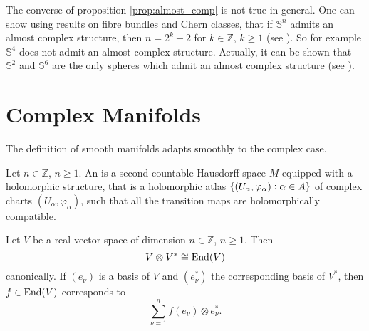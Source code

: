 \begin{remark}
The converse of proposition \ref{prop:almost_comp} is not true in general. One can show using results on fibre bundles and Chern classes, that if $\mathbb{S}^n$ admits an almost complex structure, then $n = 2^k - 2$ for $k \in \mathbb{Z}$, $k \geq 1$ (see \cite[219]{steenrod:topology_fibre:1951}). So for example $\mathbb{S}^4$ does not admit an almost complex structure. Actually, it can be shown that $\mathbb{S}^2$ and $\mathbb{S}^6$ are the only spheres which admit an almost complex structure (see \cite[434]{borel:steenrod:1953}).
\end{remark}

\section{Complex Manifolds}
The definition of smooth manifolds adapts smoothly to the complex case.

\begin{definition}
Let $n \in \mathbb{Z}$, $n \geq 1$. An  is a second countable Hausdorff space $M$ equipped with a holomorphic structure, that is a holomorphic atlas $\cbr[0]{(U_\alpha, \varphi_\alpha) : \alpha \in A}$ of complex charts $(U_\alpha,\varphi_\alpha)$, such that all the transition maps are holomorphically compatible.
\end{definition}

\begin{lemma}
Let $V$ be a real vector space of dimension $n \in \mathbb{Z}$, $n \geq 1$. Then
\begin{equation}
V \otimes V^* \cong \operatorname{End}(V)
\end{equation}
\noindent canonically. If $(e_\nu)$ is a basis of $V$ and $(e_\nu^*)$ the corresponding basis of $V^*$, then $f \in \operatorname{End}(V)$ corresponds to
\begin{equation}
\sum_{\nu = 1}^n f(e_\nu) \otimes e_\nu^*.
\end{equation}
\label{lem:corr}
\end{lemma}

